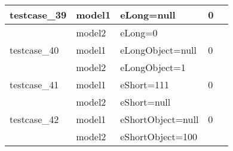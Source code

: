 \documentclass[a4paper]{article}
\begin{document}
\begin{longtable}{|l|l|l|l|l|}
testcase\_39 & model1 & eLong=null & 0 &\\
\hline
             & model2 & eLong=0 & &\\
\hline
\hline
testcase\_40 & model1 & eLongObject=null & 0 &\\
\hline
             & model2 & eLongObject=1 & &\\
\hline
\hline
testcase\_41 & model1 & eShort=111 & 0 &\\
\hline
             & model2 & eShort=null & &\\
\hline
\hline
testcase\_42 & model1 & eShortObject=null & 0 &\\
\hline
             & model2 & eShortObject=100 & &\\
\hline

\end{longtable}
\end{document}
